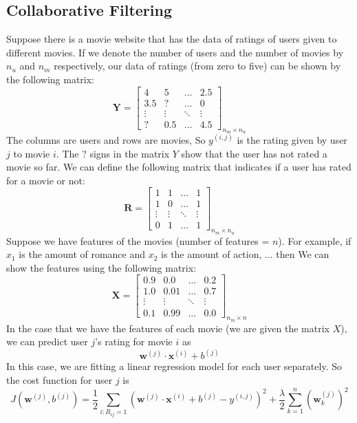 \documentclass[a4paper, 12pt]{book}
\begin{document}
\subsection{Collaborative Filtering}
Suppose there is a movie website that has the data of ratings of users given to different movies. If we denote the number of users and the number of movies by $n_u$ and $n_m$ respectively, our data of ratings (from zero to five) can be shown by the following matrix:
\[
\mathbf{Y} = \begin{bmatrix}
    4 & 5 & \dots & 2.5\\
    3.5 & ? & \dots & 0 \\
    \vdots & \vdots & \ddots & \vdots \\
    ? & 0.5 & \dots & 4.5
\end{bmatrix}_{n_m\times n_u}
\]
The columns are users and rows are movies, So $y^{(i,j)}$ is the rating given by user $j$ to movie $i$. The $\mathbf{?}$ signs in the matrix $Y$ show that the user has not rated a movie so far. We can define the following matrix that indicates if a user has rated for a movie or not:
\[
\mathbf{R} = \begin{bmatrix}
    1 & 1 & \dots & 1\\
    1 & 0 & \dots & 1 \\
    \vdots & \vdots & \ddots & \vdots \\
    0 & 1 & \dots & 1
\end{bmatrix}_{n_m\times n_u}
\]
Suppose we have features of the movies (number of features = $n$). For example, if $x_1$ is the amount of romance and $x_2$ is the amount of action, ... then We can show the features using the following matrix:
\[
\mathbf{X} = \begin{bmatrix}
    0.9 & 0.0 & \dots & 0.2\\
    1.0 & 0.01 & \dots & 0.7 \\
    \vdots & \vdots & \ddots & \vdots \\
    0.1 & 0.99 & \dots & 0.0
\end{bmatrix}_{n_m\times n}
\]
In the case that we have the features of each movie (we are given the matrix $X$), we can predict user $j$'s rating for movie $i$ as \[\mathbf{w}^{(j)} \cdot \mathbf{x}^{(i)} + b^{(j)}\] In this case, we are fitting a linear regression model for each user separately. So the cost function for user $j$ is \[J(\mathbf{w}^{(j)}, b^{(j)}) = \frac{1}{2}\sum_{i:R_{ij}=1} (\mathbf{w}^{(j)} \cdot \mathbf{x}^{(i)} + b^{(j)} - y^{(i,j)})^2 + \frac{\lambda}{2}\sum_{k=1}^{n}(\mathbf{w}^{(j)}_k)^2\]
\end{document}
